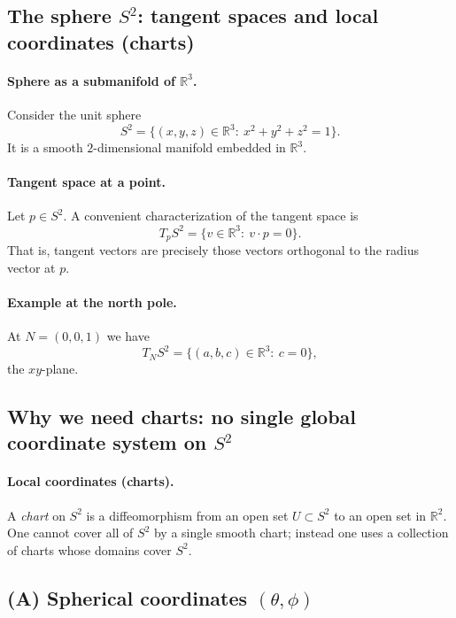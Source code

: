 \documentclass[12pt,a4paper]{article}
\theoremstyle{plain}
\theoremstyle{definition}      %
\begin{document}
	

\subsection*{The sphere $S^2$: tangent spaces and local coordinates (charts)}

\paragraph{Sphere as a submanifold of $\mathbb{R}^3$.}
Consider the unit sphere
\[
S^2=\{(x,y,z)\in\mathbb{R}^3:\ x^2+y^2+z^2=1\}.
\]
It is a smooth $2$-dimensional manifold embedded in $\mathbb{R}^3$.

\paragraph{Tangent space at a point.}
Let $p\in S^2$. A convenient characterization of the tangent space is
\[
T_pS^2=\{v\in\mathbb{R}^3:\ v\cdot p=0\}.
\]
That is, tangent vectors are precisely those vectors orthogonal to the radius vector at $p$.

\paragraph{Example at the north pole.}
At $N=(0,0,1)$ we have
\[
T_NS^2=\{(a,b,c)\in\mathbb{R}^3:\ c=0\},
\]
the $xy$-plane.

\subsection*{Why we need charts: no single global coordinate system on $S^2$}

\paragraph{Local coordinates (charts).}
A \emph{chart} on $S^2$ is a diffeomorphism from an open set $U\subset S^2$ to an open set in $\mathbb{R}^2$.
One cannot cover all of $S^2$ by a single smooth chart; instead one uses a collection of charts whose domains cover $S^2$.

\subsection*{(A) Spherical coordinates $(\theta,\phi)$}
\end{document}

